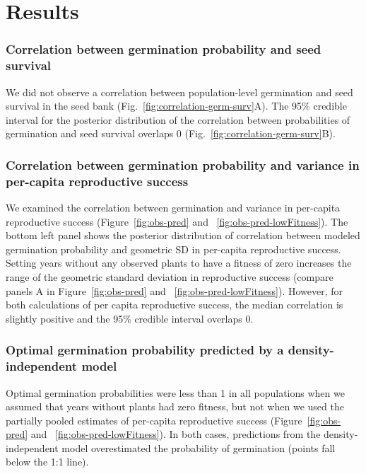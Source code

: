 \documentclass[12pt, oneside]{article}   	%
\begin{document}
\section*{Results}

\subsubsection*{Correlation between germination probability and seed survival}

We did not observe a correlation between population-level germination and seed survival in the seed bank (Fig.~\ref{fig:correlation-germ-surv}A). The 95\% credible interval for the posterior distribution of the correlation between probabilities of germination and seed survival overlaps 0 (Fig.~\ref{fig:correlation-germ-surv}B). 

\subsubsection*{Correlation between germination probability and variance in per-capita reproductive success}

We examined the correlation between germination and variance in per-capita reproductive success (Figure~\ref{fig:obs-pred} and ~\ref{fig:obs-pred-lowFitness}). The bottom left panel shows the posterior distribution of correlation between modeled germination probability and geometric SD in per-capita reproductive success. Setting years without any observed plants to have a fitness of zero increases the range of the geometric standard deviation in reproductive success (compare panels A in Figure~\ref{fig:obs-pred} and ~\ref{fig:obs-pred-lowFitness}). However, for both calculations of per capita reproductive success, the median correlation is slightly positive and the 95\% credible interval overlaps 0.

\subsubsection*{Optimal germination probability predicted by a density-independent model}

Optimal germination probabilities were less than 1 in all populations when we assumed that years without plants had zero fitness, but not when we used the partially pooled estimates of per-capita reproductive success (Figure~\ref{fig:obs-pred} and ~\ref{fig:obs-pred-lowFitness}). In both cases, predictions from the density-independent model overestimated the probability of germination (points fall below the 1:1 line).
\end{document}
